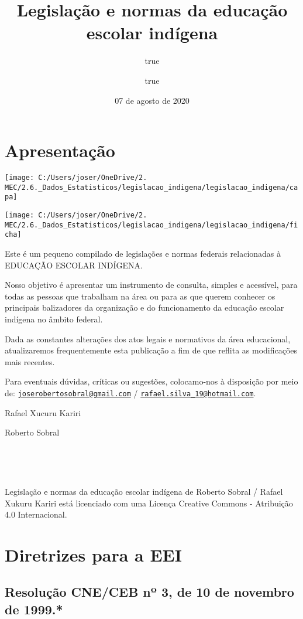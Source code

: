 \documentclass[
]{book}
\title{Legislação e normas da educação escolar indígena}
\author{true \and true}
\date{07 de agosto de 2020}
\begin{document}
\maketitle

{
\setcounter{tocdepth}{1}
\tableofcontents
}
\hypertarget{apresentauxe7uxe3o}{%
\chapter{Apresentação}\label{apresentauxe7uxe3o}}

\texttt{[image: C:/Users/joser/OneDrive/2. MEC/2.6.\_Dados\_Estatisticos/legislacao\_indigena/legislacao\_indigena/capa]}

\texttt{[image: C:/Users/joser/OneDrive/2. MEC/2.6.\_Dados\_Estatisticos/legislacao\_indigena/legislacao\_indigena/ficha]}

Este é um pequeno compilado de legislações e normas federais relacionadas à EDUCAÇÃO ESCOLAR INDÍGENA.

Nosso objetivo é apresentar um instrumento de consulta, simples e acessível, para todas as pessoas que trabalham na área ou para as que querem conhecer os principais balizadores da organização e do funcionamento da educação escolar indígena no âmbito federal.

Dada as constantes alterações dos atos legais e normativos da área educacional, atualizaremos frequentemente esta publicação a fim de que reflita as modificações mais recentes.

Para eventuais dúvidas, críticas ou sugestões, colocamo-nos à disposição por meio de: \href{mailto:joserobertosobral@gmail.com}{\nolinkurl{joserobertosobral@gmail.com}} / \href{mailto:rafael.silva_19@hotmail.com}{\nolinkurl{rafael.silva\_19@hotmail.com}}.

Rafael Xucuru Kariri

Roberto Sobral

~

~

{Legislação e normas da educação escolar indígena} de Roberto Sobral / Rafael Xukuru Kariri está licenciado com uma Licença Creative Commons - Atribuição 4.0 Internacional.

\hypertarget{intro}{%
\chapter{Diretrizes para a EEI}\label{intro}}

\hypertarget{resoluuxe7uxe3o-cneceb-nuxba-3-de-10-de-novembro-de-1999.}{%
\section{Resolução CNE/CEB nº 3, de 10 de novembro de 1999.*}\label{resoluuxe7uxe3o-cneceb-nuxba-3-de-10-de-novembro-de-1999.}}
\end{document}
